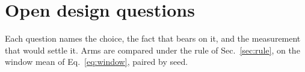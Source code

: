 
\section{Open design questions}
\label{sec:open}

Each question names the choice, the fact that bears on it, and the measurement that would
settle it. Arms are compared under the rule of Sec.~\ref{sec:rule}, on the window mean of
Eq.~\ref{eq:window}, paired by seed.

